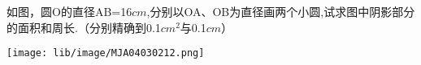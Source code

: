 如图，圆O的直径AB=16$cm$,分别以OA、OB为直径画两个小圆,试求图中阴影部分的面积和周长.（分别精确到0.1$cm^2$与0.1$cm$）

\begin{center}

    \texttt{[image: lib/image/MJA04030212.png]}

\end{center}



